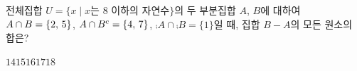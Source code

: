 전체집합 $U=\{x \mid x$는 $8$ 이하의 자연수$\}$의 두 부분집합 $A$, $B$에 대하여 $A\cap B=\{2,\mkern3mu 5\}$, $A\cap{B}^{\mathrm{c}}=\{4,\mkern3mu 7\}$, $\comp{A}\cap\comp{B}=\{1\}$일 때, 집합 $B-A$의 모든 원소의 합은?
\begin{choices32}{$14$}{$15$}{$16$}{$17$}{$18$}\end{choices32}
